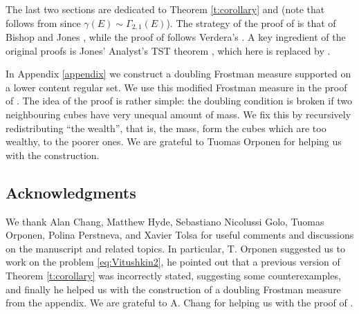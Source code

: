 \documentclass[11pt,reqno]{amsart}
\theoremstyle{definition}
\theoremstyle{remark}
\numberwithin{equation}{section}
\theoremstyle{theorem}
\theoremstyle{definition}
\theoremstyle{remark}
\numberwithin{equation}{section}
\begin{document}
	
	The last two sections are dedicated to Theorem \ref{t:corollary} and  (note that  follows from  since $\gamma(E)\sim\Gamma_{2,1}(E)$). The strategy of the proof of  is that of Bishop and Jones \cite{bishop1997wiggly}, while the proof of  follows Verdera's \cite[Theorem 4.31]{tolsa2014analytic}. A key ingredient of the original proofs is Jones' Analyst's TST theorem \cite{jones1990rectifiable}, which here is replaced by .
	
	In Appendix \ref{appendix} we construct a doubling Frostman measure supported on a lower content regular set. We use this modified Frostman measure in the proof of . The idea of the proof is rather simple: the doubling condition is broken if two neighbouring cubes have very unequal amount of mass. We fix this by recursively redistributing ``the wealth'', that is, the mass, form the cubes which are too wealthy, to the poorer ones. We are grateful to Tuomas Orponen for helping us with the construction.
	
	\subsection*{Acknowledgments}
	We thank Alan Chang, Matthew Hyde, Sebastiano Nicolussi Golo, Tuomas Orponen, Polina Perstneva, and Xavier Tolsa for useful comments and discussions on the manuscript and related topics. In particular, T. Orponen suggested us to work on the problem
	\eqref{eq:Vitushkin2}, he pointed out that a previous version of Theorem \ref{t:corollary} was incorrectly stated, suggesting some counterexamples, and finally he helped us with the construction of a doubling Frostman measure from the appendix. We are grateful to A. Chang for helping us with the proof of .
	
\end{document}
